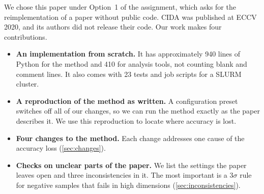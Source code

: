 We chose this paper under Option~1 of the assignment, which asks for the reimplementation of a paper without public code.
CIDA was published at ECCV 2020, and its authors did not release their code.
Our work makes four contributions.
\begin{itemize}
  \item \textbf{An implementation from scratch.} It has approximately 940 lines of Python for the method and 410 for analysis tools, not counting blank and comment lines. It also comes with 23 tests and job scripts for a SLURM cluster.
  \item \textbf{A reproduction of the method as written.} A configuration preset switches off all of our changes, so we can run the method exactly as the paper describes it. We use this reproduction to locate where accuracy is lost.
  \item \textbf{Four changes to the method.} Each change addresses one cause of the accuracy loss (\cref{sec:changes}).
  \item \textbf{Checks on unclear parts of the paper.} We list the settings the paper leaves open and three inconsistencies in it. The most important is a $3\sigma$ rule for negative samples that fails in high dimensions (\cref{sec:inconsistencies}).
\end{itemize}
